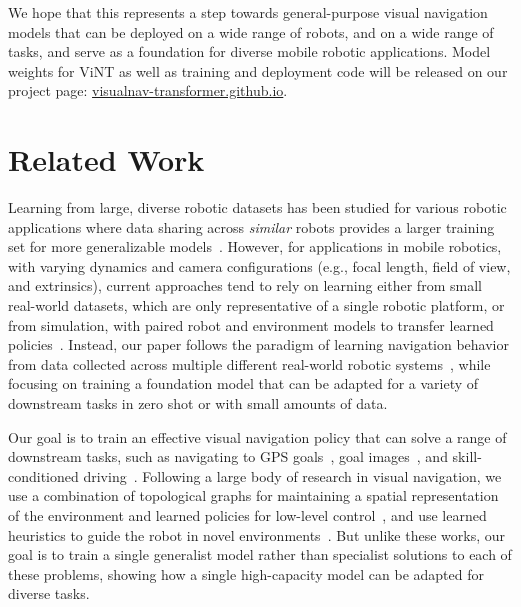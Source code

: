 \documentclass{article}
\newcommand{\ModelName}{ViNT\xspace}
\newcommand{\basement}{foundation\xspace}
\begin{document}
We hope that this represents a step towards general-purpose visual navigation models that can be deployed on a wide range of robots, and on a wide range of tasks, and serve as a \basement for diverse mobile robotic applications.
Model weights for \ModelName as well as training and deployment code will be released on our project page: \href{https://visualnav-transformer.github.io}{visualnav-transformer.github.io}.

\vspace*{-0.5em}
\section{Related Work}
\label{sec:related_work}
\vspace*{-0.5em}


Learning from large, diverse robotic datasets has been studied for various robotic applications where data sharing across \emph{similar} robots provides a larger training set for more generalizable models~\cite{devin2017multi, dasari2020robonet, Yu2020bdd100k}. However, for applications in mobile robotics, with varying dynamics and camera configurations (e.g., focal length, field of view, and extrinsics),
current approaches tend to rely on learning either from small real-world datasets, which are only representative of a single robotic platform, or from simulation, with paired robot and environment models to transfer learned policies~\cite{anderson2020simtoreal, truong2023i2o, kadian2020sim2real}. Instead, our paper follows the paradigm of learning navigation behavior from data collected across multiple different real-world robotic systems~\cite{loquercio2018dronet, shah2022gnm}, while focusing on training a \basement model that can be adapted for a variety of downstream tasks in zero shot or with small amounts of data.

Our goal is to train an effective visual navigation policy that can solve a range of downstream tasks, such as navigating to GPS goals~\cite{savva2019habitat}, goal images~\cite{zhu2016targetdriven}, and skill-conditioned driving~\cite{Codevilla2017CIL}.%
Following a large body of research in visual navigation, we use a combination of topological graphs for maintaining a spatial representation of the environment and learned policies for low-level control~\cite{savinov2018sptm, bruce2018deployable, faust2018prm, meng2020scaling, shah2020ving, hirose2019deep}, and use learned heuristics to guide the robot in novel environments~\cite{truong2023i2o,shah2022viking}. But unlike these works, our goal is to train a single generalist model rather than specialist solutions to each of these problems, showing how a single high-capacity model can be adapted for diverse tasks.
\end{document}
